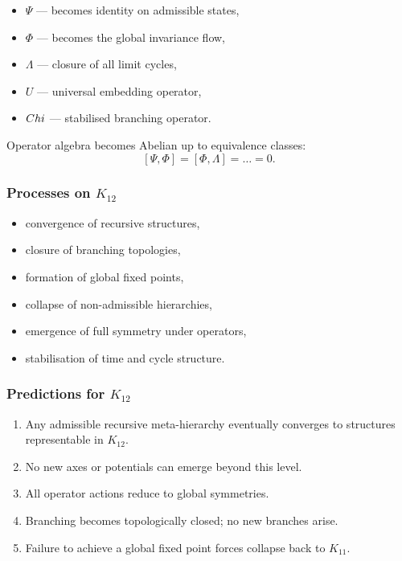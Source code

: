 \begin{itemize}
    \item $\Psi$ — becomes identity on admissible states,
    \item $\Phi$ — becomes the global invariance flow,
    \item $\Lambda$ — closure of all limit cycles,
    \item $U$ — universal embedding operator,
    \item $Chi$ — stabilised branching operator.
\end{itemize}

Operator algebra becomes Abelian up to equivalence classes:
\[
[\Psi,\Phi]=[\Phi,\Lambda]=\dots = 0.
\]

\subsubsection{Processes on $K_{12}$}

\begin{itemize}
    \item convergence of recursive structures,
    \item closure of branching topologies,
    \item formation of global fixed points,
    \item collapse of non-admissible hierarchies,
    \item emergence of full symmetry under operators,
    \item stabilisation of time and cycle structure.
\end{itemize}

\subsubsection{Predictions for $K_{12}$}

\begin{enumerate}
    \item Any admissible recursive meta-hierarchy eventually converges to
          structures representable in $K_{12}$.
    \item No new axes or potentials can emerge beyond this level.
    \item All operator actions reduce to global symmetries.
    \item Branching becomes topologically closed; no new branches arise.
    \item Failure to achieve a global fixed point forces collapse back to $K_{11}$.
\end{enumerate}

